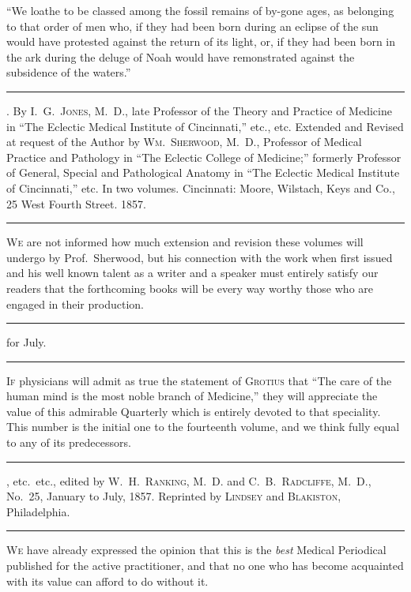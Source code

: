 
``We loathe to be classed among the fossil remains of by-gone ages,
as belonging to that order of men who, if they had been born during
an eclipse of the sun would have protested against the return of its
light, or, if they had been born in the ark during the deluge of Noah
would have remonstrated against the subsidence of the waters.''

\fancybreak{* * *}
\footnotesize
{}. By I.~G.\ \textsc{Jones}, M.~D., late Professor of the
Theory and Practice of Medicine in ``The Eclectic Medical Institute of Cincinnati,''
etc., etc. Extended and Revised at request of the Author by \textsc{Wm.\ Sherwood}, M.~D.,
Professor of Medical Practice and Pathology in ``The Eclectic College of Medicine;''
formerly Professor of General, Special and Pathological Anatomy in ``The Eclectic
Medical Institute of Cincinnati,'' etc. In two volumes. Cincinnati: Moore, Wilstach,
Keys and Co., 25 West Fourth Street. 1857.
\plainbreak{1}
\normalsize

\lettrine[lines=1]{}{We} are not informed how much extension and revision these volumes
will undergo by Prof.\ Sherwood, but his connection with the work when
first issued and his well known talent as a writer and a speaker must
entirely satisfy our readers that the forthcoming books will be every
way worthy those who are engaged in their production.

\fancybreak{* * *}
\footnotesize
{} for July.
\plainbreak{1}
\normalsize

\lettrine[lines=1]{}{If} physicians will admit as true the statement of \textsc{Grotius} that ``The
care of the human mind is the most noble branch of Medicine,'' they
will appreciate the value of this admirable Quarterly which is entirely
devoted to that speciality. This number is the initial one to the fourteenth
volume, and we think fully equal to any of its predecessors.

\fancybreak{* * *}
\footnotesize
{}, etc.\ etc., edited by \textsc{W.~H.\ Ranking, M.~D.}
and \textsc{C.~B.\ Radcliffe, M.~D.}, No.\ 25, January to July, 1857. Reprinted by \textsc{Lindsey} and
\textsc{Blakiston}, Philadelphia.
\plainbreak{1}
\normalsize

\lettrine[lines=1]{}{We} have already expressed the opinion that this is the \emph{best} Medical
Periodical published for the active practitioner, and that no one who
has become acquainted with its value can afford to do without it.

